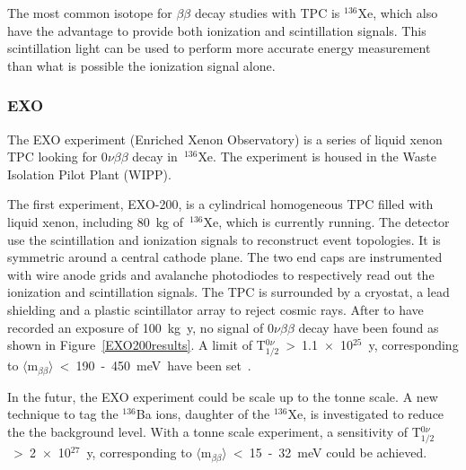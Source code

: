 \documentclass[main.tex]{subfiles}
\begin{document}
\bigskip


\NI The most common isotope for $\beta\beta$ decay studies with TPC is $^{\text{136}}$Xe, which also have the advantage to provide both ionization and scintillation signals. This scintillation light can be used to perform more accurate energy measurement than what is possible the ionization signal alone.    


\subsubsection{EXO}


\NI The EXO experiment (Enriched Xenon Observatory) is a series of liquid xenon TPC looking for 0$\nu\beta\beta$ decay in~$^{\text{136}}$Xe. The experiment is housed in the Waste Isolation Pilot Plant (WIPP). 


\bigskip


\NI The first experiment, EXO-200, is a cylindrical homogeneous TPC filled with liquid xenon, including 80~kg of~$^{\text{136}}$Xe, which is currently running. The detector use the scintillation and ionization signals to reconstruct event topologies. It is symmetric around a central cathode plane. The two end caps are instrumented with wire anode grids and avalanche photodiodes to respectively read out the ionization and scintillation signals. The TPC is surrounded by a cryostat, a lead shielding and a plastic scintillator array to reject cosmic rays. After to have recorded an exposure of 100~kg~y, no signal of 0$\nu\beta\beta$ decay have been found as shown in Figure~\ref{EXO200results}. A limit of T$_{\text{1/2}}^{0\nu}$~>~1.1~$\times$~10$^{\text{25}}$~y, corresponding to $\langle \text{m}_{\beta\beta} \rangle$~<~190~-~450~meV~have been set~\cite{EXO-200}. 


\bigskip


\NI In the futur, the EXO experiment could be scale up to the tonne scale. A new technique to tag the $^{\text{136}}$Ba ions, daughter of the $^{\text{136}}$Xe, is investigated to reduce the the background level. With a tonne scale experiment, a sensitivity of T$_{\text{1/2}}^{0\nu}$~>~2~$\times$~10$^{\text{27}}$~y, corresponding to $\langle \text{m}_{\beta\beta} \rangle$~<~15~-~32~meV could be achieved.
\end{document}
